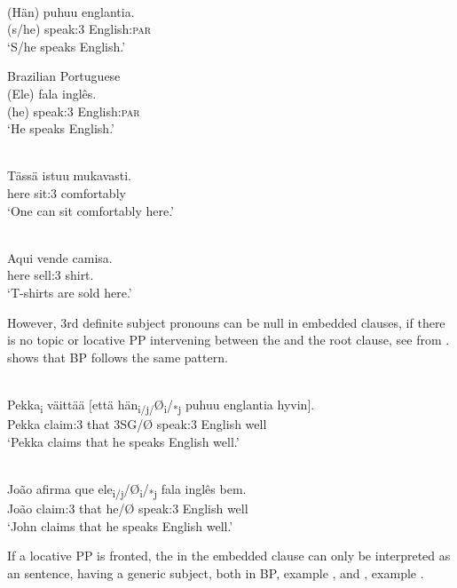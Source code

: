 \documentclass[output=paper]{LSP/langsci}
\begin{document}
\ea\label{ex:1.alexiadou}
\\
\gll {\upshape *} (Hän) puhuu englantia.\\
 {} (s/he) speak:3 English:\textsc{par}\\
\glt ‘S/he speaks English.’
\z


\ea\label{ex:2.alexiadou}
{Brazilian Portuguese}{}\\
\gll {\upshape *} (Ele) fala inglês.\\
     {} (he) speak:3 English:\textsc{par}\\
\glt ‘He speaks English.’
\z



\ea\label{ex:3.alexiadou}
\\
\gll Tässä istuu mukavasti.\\
 here sit:3 comfortably\\
\glt ‘One can sit comfortably here.’
\z


\ea\label{ex:4.alexiadou}
\\
\gll Aqui vende camisa.\\
 here sell:3 shirt.\\
\glt ‘T-shirts are sold here.’
\z


However, 3rd definite subject pronouns can be null in embedded clauses, if there is no topic or locative PP intervening between the  and the root clause, see  from .  shows that BP follows the same pattern.


\ea\label{ex:5.alexiadou}
\\
\gll Pekka\textsubscript{i} väittää [että hän\textsubscript{i/j/}Ø\textsubscript{i}/\textsubscript{*j} puhuu englantia hyvin].\\
 Pekka claim:3 that 3SG/Ø speak:3 English well\\
\glt ‘Pekka claims that he speaks English well.’
\z


\ea\label{ex:6.alexiadou}
\\
\gll João afirma que {ele\textsubscript{i/j}\slash Ø\textsubscript{i}\slash\textsubscript{*j}} fala inglês bem.\\
 João claim:3 that he/Ø speak:3 English well\\
\glt ‘John claims that he speaks English well.’
\z

If a locative PP is fronted, the  in the embedded clause can only be interpreted as an  sentence, having a generic subject, both in BP, example , and , example .
\end{document}
